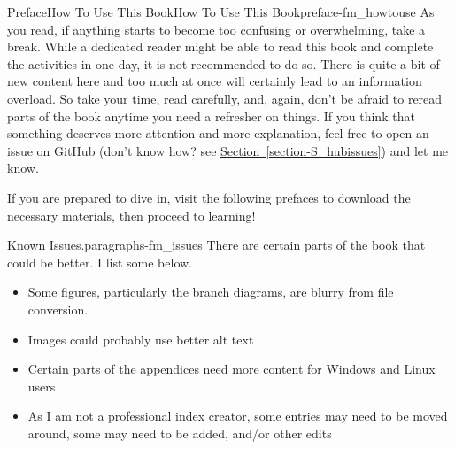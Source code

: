\documentclass[oneside,10pt,]{book}
\newcommand{\xreffont}{\relax}
\begin{document}
\begin{preface}{Preface}{How To Use This Book}{}{How To Use This Book}{}{}{preface-fm_howtouse}
As you read, if anything starts to become too confusing or overwhelming, take a break. While a dedicated reader might be able to read this book and complete the activities in one day, it is not recommended to do so. There is quite a bit of new content here and too much at once will certainly lead to an information overload. So take your time, read carefully, and, again, don't be afraid to reread parts of the book anytime you need a refresher on things. If you think that something deserves more attention and more explanation, feel free to open an issue on GitHub (don't know how? see \hyperref[section-S_hubissues]{Section~{\xreffont\ref{section-S_hubissues}}}) and let me know.%
\par
If you are prepared to dive in, visit the following prefaces to download the necessary materials, then proceed to learning!%
\begin{paragraphs}{Known Issues.}{paragraphs-fm_issues}%
There are certain parts of the book that could be better. I list some below.%
\begin{itemize}[label=\textbullet]
\item{}Some figures, particularly the branch diagrams, are blurry from file conversion.%
\item{}Images could probably use better alt text%
\item{}Certain parts of the appendices need more content for Windows and Linux users%
\item{}As I am not a professional index creator, some entries may need to be moved around, some may need to be added, and\slash{}or other edits%
\end{itemize}
%
\end{paragraphs}%
\end{preface}
%
%
\typeout{************************************************}
\typeout{************************************************}
%
\end{document}

